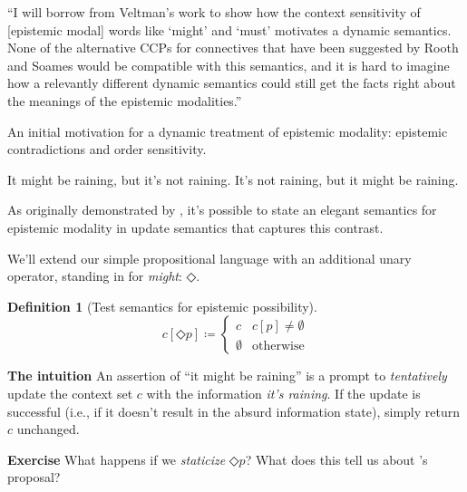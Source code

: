 \documentclass[nols,twoside,nofonts,nobib,nohyper]{tufte-handout}
\theoremstyle{definition}
\newtheorem{definition}{Definition}[section]
\begin{document}

\begin{displayquote}
  \enquote{I will borrow from Veltman’s work to show how the context sensitivity of [epistemic modal] words like `might' and `must' motivates a dynamic semantics. None of the alternative CCPs for connectives
that have been suggested by Rooth and Soames would be compatible with this semantics, and it is hard to imagine how a relevantly different dynamic semantics could still get the facts right about the meanings of the epistemic modalities.}
\end{displayquote}

An initial motivation for a dynamic treatment of epistemic modality: epistemic contradictions and order sensitivity.

\pex\label{moore}
\a{}It might be raining, but it's not raining.\label{moore1}
\a\ljudge{\#}It's not raining, but it might be raining.\label{moore2}
\xe

As originally demonstrated by \citet{Veltman1996}, it's possible to state an elegant semantics for epistemic modality in update semantics that captures this contrast.

We'll extend our simple propositional language with an additional unary operator, standing in for \textit{might}: $◇$.

\begin{definition}[Test semantics for epistemic possibility]
  $$
  c[◇ p] ≔ \begin{cases}
    c&c[p] ≠ ∅\\
    ∅&\text{otherwise}
    \end{cases}
  $$
\end{definition}

\begin{tcolorbox}
  \textbf{The intuition}
  \tcblower
  An assertion of \enquote{it might be raining} is a prompt to \textit{tentatively} update the context set $c$ with the information \textit{it's raining}. If the update is successful (i.e., if it doesn't result in the absurd information state), simply return $c$ unchanged.
\end{tcolorbox}

\begin{tcolorbox}
  \textbf{Exercise}
  \tcblower
  What happens if we \textit{staticize} $◇ p$? What does this tell us about \citeauthor{Veltman1996}'s proposal?
\end{tcolorbox}
\end{document}
